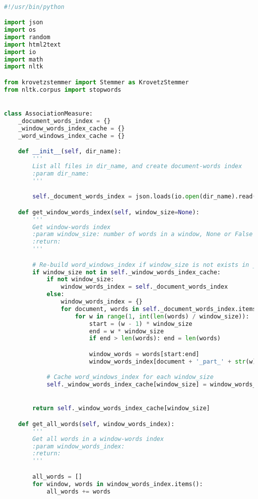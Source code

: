 \documentclass[letterpaper,11pt]{article}
\begin{document}
\begin{lstlisting}[language=python, caption={Association Measure}, label={lst:assoc_measure}]

#!/usr/bin/python

import json
import os
import random
import html2text
import io
import math
import nltk

from krovetzstemmer import Stemmer as KrovetzStemmer
from nltk.corpus import stopwords


class AssociationMeasure:
    _document_words_index = {}
    _window_words_index_cache = {}
    _word_windows_index_cache = {}

    def __init__(self, dir_name):
        '''
        List all files in dir_name, and create document-words index
        :param dir_name:
        '''

        self._document_words_index = json.loads(io.open(dir_name).read())

    def get_window_words_index(self, window_size=None):
        '''
        Get window-words index
        :param window_size: number of words in a window, None or False if use document
        :return:
        '''

        # Re-build word_windows_index if window_size is not exists in _word_windows_index_cache
        if window_size not in self._window_words_index_cache:
            if not window_size:
                window_words_index = self._document_words_index
            else:
                window_words_index = {}
                for document, words in self._document_words_index.items():
                    for w in range(1, int(len(words) / window_size)):
                        start = (w - 1) * window_size
                        end = w * window_size
                        if end > len(words): end = len(words)

                        window_words = words[start:end]
                        window_words_index[document + '_part_' + str(w)] = window_words

            # Cache word_windows_index for each window_size
            self._window_words_index_cache[window_size] = window_words_index


        return self._window_words_index_cache[window_size]

    def get_all_words(self, window_words_index):
        '''
        Get all words in a window-words index
        :param window_words_index:
        :return:
        '''

        all_words = []
        for window, words in window_words_index.items():
            all_words += words


\end{lstlisting}
\end{document}
